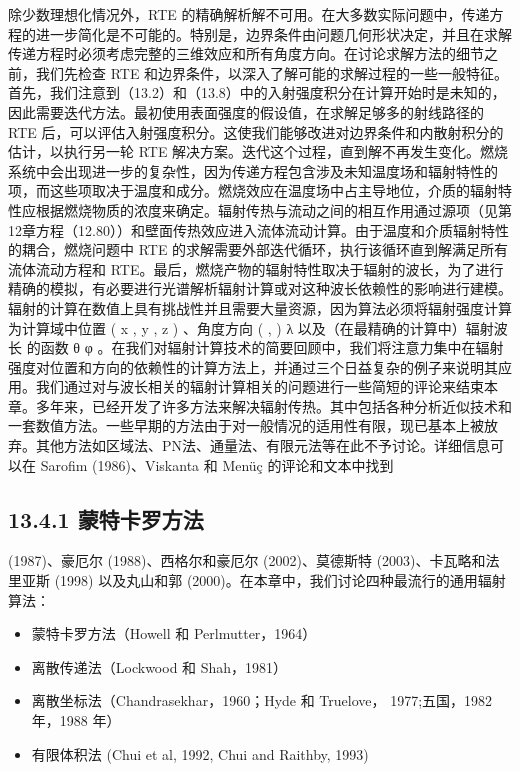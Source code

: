 \documentclass[11pt,a4paper,openany,fontset=none]{ctexbook}
\begin{document}
除少数理想化情况外，RTE 的精确解析解不可用。在大多数实际问题中，传递方程的进一步简化是不可能的。特别是，边界条件由问题几何形状决定，并且在求解传递方程时必须考虑完整的三维效应和所有角度方向。在讨论求解方法的细节之前，我们先检查 RTE 和边界条件，以深入了解可能的求解过程的一些一般特征。首先，我们注意到（13.2）和（13.8）中的入射强度积分在计算开始时是未知的，因此需要迭代方法。最初使用表面强度的假设值，在求解足够多的射线路径的 RTE 后，可以评估入射强度积分。这使我们能够改进对边界条件和内散射积分的估计，以执行另一轮 RTE 解决方案。迭代这个过程，直到解不再发生变化。燃烧系统中会出现进一步的复杂性，因为传递方程包含涉及未知温度场和辐射特性的项，而这些项取决于温度和成分。燃烧效应在温度场中占主导地位，介质的辐射特性应根据燃烧物质的浓度来确定。辐射传热与流动之间的相互作用通过源项（见第12章方程（12.80））和壁面传热效应进入流体流动计算。由于温度和介质辐射特性的耦合，燃烧问题中 RTE 的求解需要外部迭代循环，执行该循环直到解满足所有流体流动方程和 RTE。最后，燃烧产物的辐射特性取决于辐射的波长，为了进行精确的模拟，有必要进行光谱解析辐射计算或对这种波长依赖性的影响进行建模。辐射的计算在数值上具有挑战性并且需要大量资源，因为算法必须将辐射强度计算为计算域中位置 ( x , y , z ) 、角度方向 ( , ) λ 以及（在最精确的计算中）辐射波长 的函数 θ φ 。在我们对辐射计算技术的简要回顾中，我们将注意力集中在辐射强度对位置和方向的依赖性的计算方法上，并通过三个日益复杂的例子来说明其应用。我们通过对与波长相关的辐射计算相关的问题进行一些简短的评论来结束本章。多年来，已经开发了许多方法来解决辐射传热。其中包括各种分析近似技术和一套数值方法。一些早期的方法由于对一般情况的适用性有限，现已基本上被放弃。其他方法如区域法、PN法、通量法、有限元法等在此不予讨论。详细信息可以在 Sarofim (1986)、Viskanta 和 Menüç 的评论和文本中找到

\subsection*{13.4.1 蒙特卡罗方法}

(1987)、豪厄尔 (1988)、西格尔和豪厄尔 (2002)、莫德斯特 (2003)、卡瓦略和法里亚斯 (1998) 以及丸山和郭 (2000)。在本章中，我们讨论四种最流行的通用辐射算法：

\begin{itemize}

\item 蒙特卡罗方法（Howell 和 Perlmutter，1964）

\item 离散传递法（Lockwood 和 Shah，1981）

\item 离散坐标法（Chandrasekhar，1960；Hyde 和 Truelove， 1977;五国，1982 年，1988 年）

\item 有限体积法 (Chui et al, 1992, Chui and Raithby, 1993)

\end{itemize}
\end{document}
